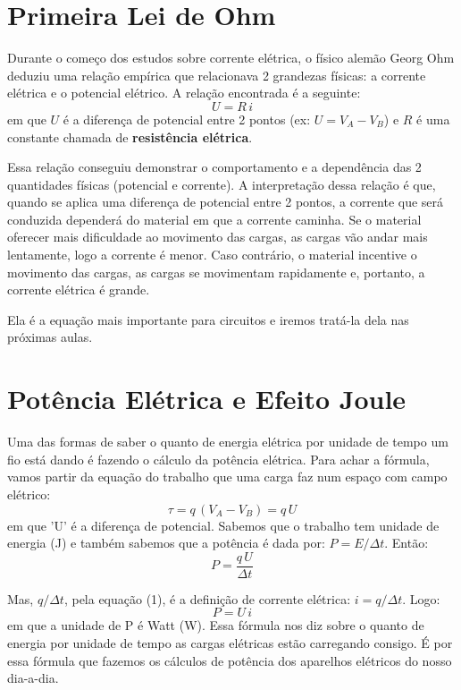 \documentclass[12pt]{extarticle}
\newcommand{\<}{\langle}
\renewcommand{\>}{\rangle}
\theoremstyle{definition}
\begin{document}
\section{Primeira Lei de Ohm}

Durante o começo dos estudos sobre corrente elétrica, o físico alemão Georg Ohm deduziu uma relação empírica que relacionava 2 grandezas físicas: a corrente elétrica e o potencial elétrico. A relação encontrada é a seguinte:
\begin{equation}
    U = R\,i
\end{equation}
\noindent em que $U$ é a diferença de potencial entre 2 pontos (ex: $U= V_A-V_B$) e $R$ é uma constante chamada de \textbf{resistência elétrica}.

Essa relação conseguiu demonstrar o comportamento e a dependência das 2 quantidades físicas (potencial e corrente). A interpretação dessa relação é que, quando se aplica uma diferença de potencial entre 2 pontos, a corrente que será conduzida dependerá do material em que a corrente caminha. Se o material oferecer mais dificuldade ao movimento das cargas, as cargas vão andar mais lentamente, logo a corrente é menor. Caso contrário, o material incentive o movimento das cargas, as cargas se movimentam rapidamente e, portanto, a corrente elétrica é grande. 

Ela é a equação mais importante para circuitos e iremos tratá-la dela nas próximas aulas.

\section{Potência Elétrica e Efeito Joule}

Uma das formas de saber o quanto de energia elétrica por unidade de tempo um fio está dando é fazendo o cálculo da potência elétrica. Para achar a fórmula, vamos partir da equação do trabalho que uma carga faz num espaço com campo elétrico:
\begin{equation}
    \tau = q\,(V_A-V_B) = q\,U
\end{equation}
\noindent em que 'U' é a diferença de potencial. Sabemos que o trabalho tem unidade de energia (J) e também sabemos que a potência é dada por: $P = E/\Delta t$. Então:
\begin{equation}
    P = \frac{q\,U}{\Delta t}
\end{equation}

Mas, $q/ \Delta t$, pela equação (1), é a definição de corrente elétrica: $i = q/\Delta t$. Logo:
\begin{equation}
    P = U\,i
\end{equation}
\noindent em que a unidade de P é Watt (W). Essa fórmula nos diz sobre o quanto de energia por unidade de tempo as cargas elétricas estão carregando consigo. É por essa fórmula que fazemos os cálculos de potência dos aparelhos elétricos do nosso dia-a-dia. 
\end{document}
